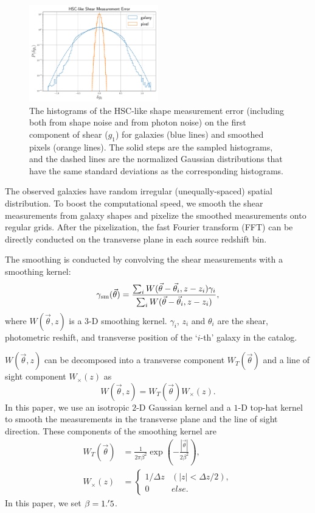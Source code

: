 \documentclass[twocolumn]{aastex62}
\begin{document}
\begin{figure}[!t]
 \centering
 \includegraphics[width=0.5\textwidth]{shapeMeasurementError-HSCY1.pdf}
 \caption{The histograms of the HSC-like shape measurement error (including
         both from shape noise and from photon noise) on the first component of
         shear ($g_1$) for galaxies (blue lines) and smoothed pixels (orange
         lines). The solid steps are the sampled histograms, and the dashed
         lines are the normalized Gaussian distributions that have the same
         standard deviations as the corresponding histograms.
        }
 \label{fig_noiseHistogram}
\end{figure}

The observed galaxies have random irregular (unequally-spaced) spatial
distribution. To boost the computational speed, we smooth the shear
measurements from galaxy shapes and pixelize the smoothed measurements onto
regular grids.  After the pixelization, the fast Fourier transform (FFT) can be
directly conducted on the transverse plane in each source redshift bin.

The smoothing is conducted by convolving the shear measurements with a
smoothing kernel:
\begin{equation}
\gamma_{\rm{sm}} (\vec{\theta})  = \frac{\sum_i
W(\vec{\theta}-\vec{{\theta}}_i,z-z_i) \gamma_i}{\sum_i
W(\vec{\theta}-\vec{{\theta}}_i,z-z_i) },
\end{equation}
where $W(\vec{\theta},z)$ is a $3$-D smoothing kernel. $\gamma_i$, $z_i$ and
$\theta_i$ are the shear, photometric reshift, and transverse position of the
`$i$-th' galaxy in the catalog.

$W(\vec{\theta},z)$ can be decomposed into a transverse component
$W_T(\vec{\theta})$ and a line of sight component
$W_\times(z)$ as
\begin{equation}
W(\vec{\theta},z)=W_T(\vec{\theta}) W_\times (z).
\end{equation}
In this paper, we use an isotropic $2$-D Gaussian kernel and a $1$-D top-hat
kernel to smooth the measurements in the transverse plane and the line of sight
direction. These components of the smoothing kernel are
\begin{equation}
\begin{split}
W_T(\vec{\theta}) &=\frac{1}{2\pi\beta^2}\exp(-\frac{|\vec{\theta}|}{2\beta^2}),\\
W_\times (z) &=
\begin{cases}
1/\Delta z& (|z|<\Delta z/2),\\
0& else.
\end{cases}
\end{split}
\end{equation}
In this paper, we set $\beta=1.\mbox{$^\prime$}5$.
\end{document}
